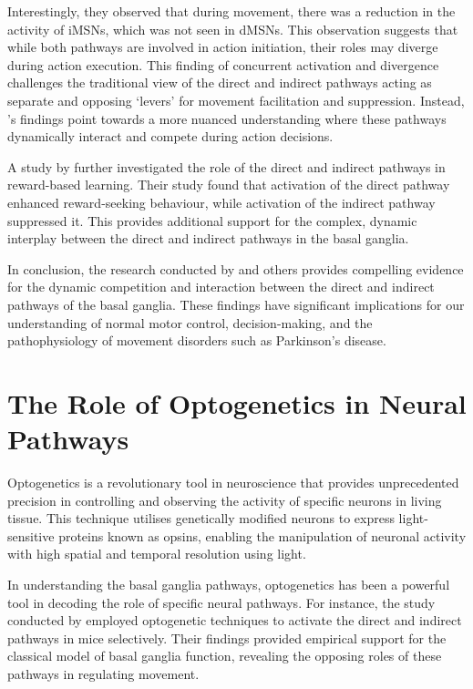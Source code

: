 \documentclass[10pt]{article}
\begin{document}
\begin{sloppypar}
  Interestingly, they observed that during movement, there was a reduction in the activity of iMSNs, which was not seen in dMSNs. This observation suggests that while both pathways are involved in action initiation, their roles may diverge during action execution. This finding of concurrent activation and divergence challenges the traditional view of the direct and indirect pathways acting as separate and opposing ‘levers’ for movement facilitation and suppression. Instead, \citeauthor{cui_concurrent_2013}’s findings point towards a more nuanced understanding where these pathways dynamically interact and compete during action decisions.

  A study by \cite{guillaumin_optogenetic_2020} further investigated the role of the direct and indirect pathways in reward-based learning. Their study found that activation of the direct pathway enhanced reward-seeking behaviour, while activation of the indirect pathway suppressed it. This provides additional support for the complex, dynamic interplay between the direct and indirect pathways in the basal ganglia.

  In conclusion, the research conducted by \citeauthor{cui_concurrent_2013} and others provides compelling evidence for the dynamic competition and interaction between the direct and indirect pathways of the basal ganglia. These findings have significant implications for our understanding of normal motor control, decision-making, and the pathophysiology of movement disorders such as Parkinson’s disease.

  \section{The Role of Optogenetics in Neural Pathways}
  \label{sec:the-role-of-optogenetics-in-neural-pathways}

  Optogenetics is a revolutionary tool in neuroscience that provides unprecedented precision in controlling and observing the activity of specific neurons in living tissue. This technique utilises genetically modified neurons to express light-sensitive proteins known as opsins, enabling the manipulation of neuronal activity with high spatial and temporal resolution using light.

  In understanding the basal ganglia pathways, optogenetics has been a powerful tool in decoding the role of specific neural pathways. For instance, the study conducted by \cite{kravitz_regulation_2010} employed optogenetic techniques to activate the direct and indirect pathways in mice selectively. Their findings provided empirical support for the classical model of basal ganglia function, revealing the opposing roles of these pathways in regulating movement.


\end{sloppypar}
\end{document}
